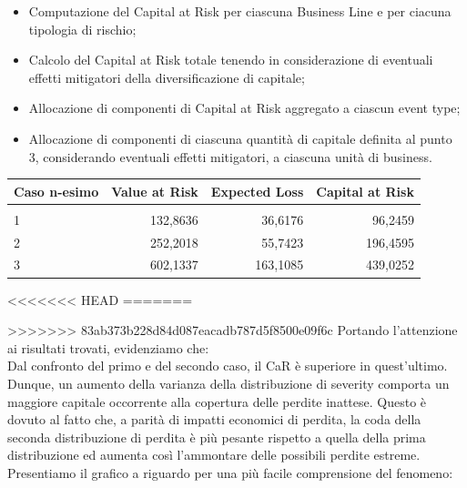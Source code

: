 \documentclass[titlepage]{article}
\begin{document}
\begin{itemize}
{\begin{itemize}
	\item 	Computazione del Capital at Risk per ciascuna Business Line e per ciacuna tipologia di rischio;
	\item Calcolo del Capital at Risk totale tenendo in considerazione di eventuali effetti mitigatori della diversificazione di capitale;
	\item 	Allocazione di componenti di Capital at Risk aggregato a ciascun event type;
	\item 	Allocazione di componenti di ciascuna quantità di capitale definita al punto 3, considerando eventuali effetti mitigatori, a ciascuna unità di business.
\end{itemize}
\begin{table}[htbp]
	\centering
	\begin{tabular}{l|rrr}
		Caso n-esimo & Value at Risk & Expected Loss& Capital at Risk \\\hline
		\\
		1 & 132,8636&36,6176&96,2459 \\
		2 & 252,2018 &55,7423&196,4595\\
		3 & 602,1337 &163,1085&439,0252
	\end{tabular}
\end{table}
<<<<<<< HEAD
\newpage
=======

>>>>>>> 83ab373b228d84d087eacadb787d5f8500e09f6c
Portando l’attenzione ai risultati trovati, evidenziamo che:
\\

		Dal confronto del primo e del secondo caso, il CaR è superiore in quest’ultimo. Dunque, un aumento della varianza della distribuzione di severity comporta un maggiore capitale occorrente alla copertura delle perdite inattese. Questo è dovuto al fatto che, a parità di impatti economici di perdita, la coda della seconda distribuzione di perdita è più pesante rispetto a quella della prima distribuzione ed aumenta così l’ammontare delle possibili perdite estreme. Presentiamo il grafico a riguardo per una più facile comprensione del fenomeno:



}
\end{itemize}
\end{document}
